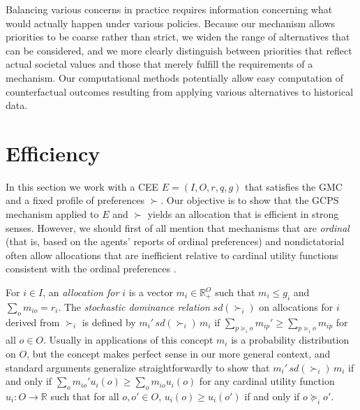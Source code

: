 \documentclass[12pt, A4paper]{article}
\theoremstyle{definition}
\renewcommand{\Re}{\mathbb{R}}
\begin{document}
Balancing various concerns in practice requires information concerning what would actually happen under various policies.  Because our mechanism allows priorities to be coarse rather than strict, we widen the range of alternatives that can be considered, and we more clearly distinguish between priorities that reflect actual societal values and those that merely fulfill the requirements of a mechanism.
Our computational methods potentially allow easy computation of counterfactual outcomes resulting from applying various alternatives to historical data.


\section{Efficiency} \label{sec:Efficiency}

In this section we work with a CEE $E = (I,O,r,q,g)$ that satisfies the GMC and a fixed profile of preferences $\succ$.  Our objective is to show that the GCPS mechanism applied to $E$ and $\succ$ yields an allocation that is efficient in strong senses. However, we should first of all mention that mechanisms that are \emph{ordinal} (that is, based on the agents' reports of ordinal preferences) and nondictatorial often allow allocations that are inefficient relative to cardinal utility functions consistent with the ordinal preferences \citep{FeNi08,Mir09,AbChYa11,Tro12,AbChYa15}.

For $i \in I$, an \emph{allocation for $i$} is a vector $m_i \in \Re^O_+$ such that $m_i \le g_i$ and 
$\sum_o m_{io} = r_i$.  The \emph{stochastic dominance relation} ${sd}(\succ_i)$ on allocations for $i$ derived from $\succ_i$ is defined by $m_i' \, {sd}(\succ_i) \, m_i$ if $\sum_{p \succeq_i o} m_{ip}' \ge \sum_{p \succeq_i o} m_{ip}$ for all $o \in O$.  Usually in applications of this concept $m_i$ is a probability distribution on $O$, but the concept makes perfect sense in our more general context, and standard arguments generalize straightforwardly to show that $m_i' \, {sd}(\succ_i) \, m_i$ if and only if $\sum_o m_{io}' u_i(o) \ge \sum_o m_{io} u_i(o)$ for any cardinal utility function $u_i : O \to \Re$ such that for all $o,o' \in O$, $u_i(o) \ge u_i(o')$ if and only if $o \succeq_i o'$.
\end{document}
